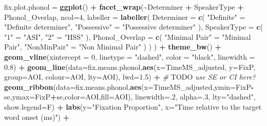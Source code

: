 \documentclass[
]{article}
\newenvironment{Shaded}{\begin{snugshade}}{\end{snugshade}}
\newcommand{\AlertTok}[1]{\textcolor[rgb]{0.94,0.16,0.16}{#1}}
\newcommand{\AttributeTok}[1]{\textcolor[rgb]{0.13,0.29,0.53}{#1}}
\newcommand{\CommentTok}[1]{\textcolor[rgb]{0.56,0.35,0.01}{\textit{#1}}}
\newcommand{\DecValTok}[1]{\textcolor[rgb]{0.00,0.00,0.81}{#1}}
\newcommand{\FloatTok}[1]{\textcolor[rgb]{0.00,0.00,0.81}{#1}}
\newcommand{\FunctionTok}[1]{\textcolor[rgb]{0.13,0.29,0.53}{\textbf{#1}}}
\newcommand{\NormalTok}[1]{#1}
\newcommand{\OtherTok}[1]{\textcolor[rgb]{0.56,0.35,0.01}{#1}}
\newcommand{\SpecialCharTok}[1]{\textcolor[rgb]{0.81,0.36,0.00}{\textbf{#1}}}
\newcommand{\StringTok}[1]{\textcolor[rgb]{0.31,0.60,0.02}{#1}}
\begin{document}
\begin{Shaded}
\begin{Highlighting}[]
\NormalTok{fix.plot.phonol }\OtherTok{=} \FunctionTok{ggplot}\NormalTok{() }\SpecialCharTok{+} 
  \FunctionTok{facet\_wrap}\NormalTok{(}\SpecialCharTok{\textasciitilde{}}\NormalTok{Determiner }\SpecialCharTok{+}\NormalTok{ SpeakerType }\SpecialCharTok{+}\NormalTok{ Phonol\_Overlap, }\AttributeTok{ncol=}\DecValTok{4}\NormalTok{,}
             \AttributeTok{labeller =} \FunctionTok{labeller}\NormalTok{(}
              \AttributeTok{Determiner =} \FunctionTok{c}\NormalTok{(}
                \StringTok{"Definite"} \OtherTok{=} \StringTok{"Definite determiner"}\NormalTok{,}
                \StringTok{"Possessive"} \OtherTok{=} \StringTok{"Possessive determiner"}
\NormalTok{              ),}
              \AttributeTok{SpeakerType =} \FunctionTok{c}\NormalTok{(}
                \StringTok{"1"} \OtherTok{=} \StringTok{"ASI"}\NormalTok{,}
                \StringTok{"2"} \OtherTok{=} \StringTok{"HSS"}
\NormalTok{              ),}
              \AttributeTok{Phonol\_Overlap =} \FunctionTok{c}\NormalTok{(}
                \StringTok{"Minimal Pair"} \OtherTok{=} \StringTok{"Minimal Pair"}\NormalTok{,}
                \StringTok{"NonMinPair"} \OtherTok{=} \StringTok{"Non Minimal Pair"}
\NormalTok{              )}
\NormalTok{            )}
\NormalTok{             ) }\SpecialCharTok{+} \FunctionTok{theme\_bw}\NormalTok{() }\SpecialCharTok{+} 
  \FunctionTok{geom\_vline}\NormalTok{(}\AttributeTok{xintercept =} \DecValTok{0}\NormalTok{, }\AttributeTok{linetype =} \StringTok{"dashed"}\NormalTok{, }\AttributeTok{color =} \StringTok{"black"}\NormalTok{, }\AttributeTok{linewidth =} \FloatTok{0.8}\NormalTok{) }\SpecialCharTok{+}
  \FunctionTok{geom\_line}\NormalTok{(}\AttributeTok{data=}\NormalTok{fix.means.phonol,}\FunctionTok{aes}\NormalTok{(}\AttributeTok{x=}\NormalTok{TimeMS\_adjusted, }\AttributeTok{y=}\NormalTok{FixP, }\AttributeTok{group=}\NormalTok{AOI, }\AttributeTok{colour=}\NormalTok{AOI, }\AttributeTok{lty=}\NormalTok{AOI), }\AttributeTok{lwd=}\FloatTok{1.5}\NormalTok{) }\SpecialCharTok{+} \CommentTok{\# }\AlertTok{TODO}\CommentTok{ use SE or CI here?}
  \FunctionTok{geom\_ribbon}\NormalTok{(}\AttributeTok{data=}\NormalTok{fix.means.phonol,}\FunctionTok{aes}\NormalTok{(}\AttributeTok{x=}\NormalTok{TimeMS\_adjusted,}\AttributeTok{ymin=}\NormalTok{FixP}\SpecialCharTok{{-}}\NormalTok{se,}\AttributeTok{ymax=}\NormalTok{FixP}\SpecialCharTok{+}\NormalTok{se,}\AttributeTok{color=}\NormalTok{AOI,}\AttributeTok{fill=}\NormalTok{AOI), }\AttributeTok{linewidth=}\NormalTok{.}\DecValTok{2}\NormalTok{, }\AttributeTok{alpha=}\NormalTok{.}\DecValTok{3}\NormalTok{, }\AttributeTok{lty=}\StringTok{"dashed"}\NormalTok{, }\AttributeTok{show.legend=}\NormalTok{F)  }\SpecialCharTok{+}
  \FunctionTok{labs}\NormalTok{(}\AttributeTok{y=}\StringTok{"Fixation Proportion"}\NormalTok{, }\AttributeTok{x=}\StringTok{"Time relative to the target word onset (ms)"}\NormalTok{) }\SpecialCharTok{+} 
  

\end{Highlighting}
\end{Shaded}
\end{document}
